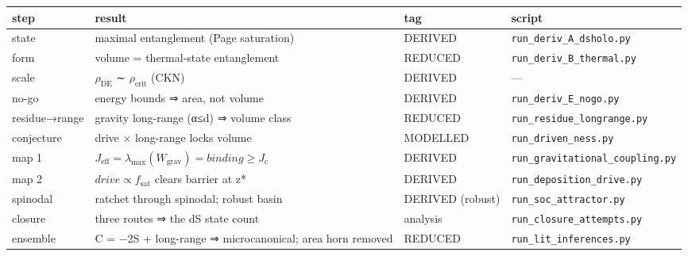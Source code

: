 \documentclass[
  10pt,
]{article}
\begin{document}
\begin{longtable}[]{@{}
  >{\raggedright\arraybackslash}p{}
  >{\raggedright\arraybackslash}p{}
  >{\raggedright\arraybackslash}p{}
  >{\raggedright\arraybackslash}p{}@{}}
\toprule\noalign{}
\begin{minipage}[b]{\linewidth}\raggedright
step
\end{minipage} & \begin{minipage}[b]{\linewidth}\raggedright
result
\end{minipage} & \begin{minipage}[b]{\linewidth}\raggedright
tag
\end{minipage} & \begin{minipage}[b]{\linewidth}\raggedright
script
\end{minipage} \\
\midrule\noalign{}
\endhead
\bottomrule\noalign{}
\endlastfoot
state & maximal entanglement (Page saturation) & DERIVED &
\texttt{run\_deriv\_A\_dsholo.py} \\
form & volume = thermal-state entanglement & REDUCED &
\texttt{run\_deriv\_B\_thermal.py} \\
scale & \(\rho _{\mathrm{DE}}\) ∼ \(\rho _{\mathrm{crit}}\) (CKN) &
DERIVED & --- \\
no-go & energy bounds ⇒ area, not volume & DERIVED &
\texttt{run\_deriv\_E\_nogo.py} \\
residue→range & gravity long-range (α≤d) ⇒ volume class & REDUCED &
\texttt{run\_residue\_longrange.py} \\
conjecture & drive × long-range locks volume & MODELLED &
\texttt{run\_driven\_ness.py} \\
map 1 &
\(J_{\mathrm{eff}} = \lambda _{\mathrm{max}}(W_{\mathrm{grav}}) = binding \geq  J_{\mathrm{c}}\)
& DERIVED & \texttt{run\_gravitational\_coupling.py} \\
map 2 & \(drive \propto  f_{\mathrm{sat}}\) clears barrier at z* &
DERIVED & \texttt{run\_deposition\_drive.py} \\
spinodal & ratchet through spinodal; robust basin & DERIVED (robust) &
\texttt{run\_soc\_attractor.py} \\
closure & three routes ⇒ the dS state count & analysis &
\texttt{run\_closure\_attempts.py} \\
ensemble & C = −2S + long-range ⇒ microcanonical; area horn removed &
REDUCED & \texttt{run\_lit\_inferences.py} \\

\end{longtable}
\end{document}
